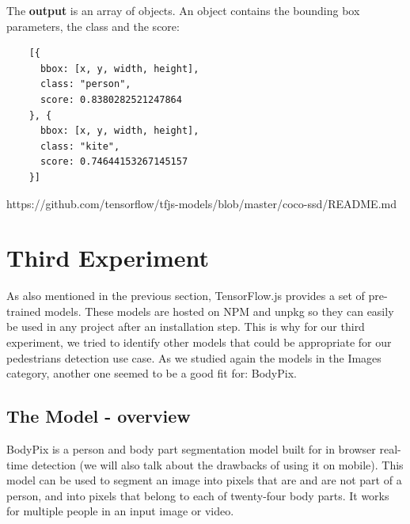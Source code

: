 \documentclass[runningheads,a4paper,11pt]{report}
\begin{document}
The \textbf{output} is an array of objects. An object contains the bounding box parameters, the class and the score: 

\begin{lstlisting}
    [{
      bbox: [x, y, width, height],
      class: "person",
      score: 0.8380282521247864
    }, {
      bbox: [x, y, width, height],
      class: "kite",
      score: 0.74644153267145157
    }]
\end{lstlisting}

https://github.com/tensorflow/tfjs-models/blob/master/coco-ssd/README.md

\section{Third Experiment}
\label{section:thirdExperiment}
As also mentioned in the previous section, TensorFlow.js provides a set of pre-trained models. These models are hosted on NPM and unpkg so they can easily be used in any project after an installation step. This is why for our third experiment, we tried to identify other models that could be appropriate for our pedestrians detection use case. As we studied again the models in the Images category, another one seemed to be a good fit for: BodyPix.

\subsection{The Model - overview}
\label{section:theModelOverview2}
BodyPix is a person and body part segmentation model built for in browser real-time detection (we will also talk about the drawbacks of using it on mobile). This model can be used to segment an image into pixels that are and are not part of a person, and into pixels that belong to each of twenty-four body parts. It works for multiple people in an input image or video. 
\end{document}
